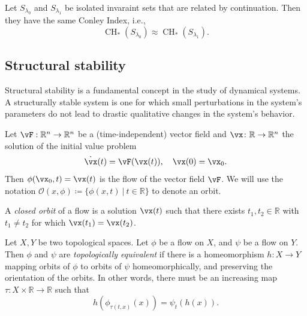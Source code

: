 \documentclass{article}
\newcommand{\reals}{\mathbb{R}}
\newcounter{ct}
\begin{document}
\begin{theorem}
Let $S_{\lambda_0}$ and $S_{\lambda_1}$ be isolated invaraint sets that are related by continuation. 
Then they have the same Conley Index, i.e.,
\[
\operatorname{CH}_*(S_{\lambda_0})\approx \operatorname{CH}_*(S_{\lambda_1}).
\]
\end{theorem}


\subsection{Structural stability}\label{sec:ss}
 \citep{peixoto1959ss, mane1987ss, hu1994ss, hayashi1997invariant, robbin1971ss, robinson1974ss, palis1970ss}

Structural stability is a fundamental concept in the study of dynamical systems. A structurally stable system is one for which small perturbations in the system's parameters do not lead to drastic qualitative changes in the system's behavior.

\begin{definition}
Let $\vF: \reals^n\rightarrow \reals^n$ be a (time-independent) vector field and $\vx\colon\reals\rightarrow\reals^n$  the solution of the initial value problem
\[
\dot\vx(t) =  \vF(\vx(t)), \ \ \ \vx(0) = \vx_0.
\]
Then $ \phi (\vx_{0},t)=\vx(t)$ is the flow of the vector field $\vF$.
We will use the notation $\mathcal {O}(x,\phi)\coloneqq \{\phi(x,t)\ |\ t\in\reals\}$ to denote an orbit.
\end{definition}


\begin{definition}
A \emph{closed orbit} of a flow is a solution $\vx(t)$ such that there exists $t_1, t_2\in\reals$ with  $t_1\neq t_2$ for which $\vx(t_1) = \vx(t_2)$.
\end{definition}

\begin{definition}
Let $X,Y$ be two topological spaces. Let $\phi$ be a flow on $X$, and $\psi$ be a flow on $Y$.
Then $\phi$ and $\psi$ are \emph{topologically equivalent} if there is a homeomorphism $h\colon X\to Y$ mapping orbits of  $\phi$  to orbits of $\psi$  homeomorphically, and preserving the orientation of the orbits. In other words, there must be  an increasing map $\tau\colon X\times\reals\rightarrow\reals$ such that 
\begin{equation}\label{eq:topeq}
h(\phi_{\tau(t,x)}(x)) = \psi_t(h(x)).
\end{equation}
\end{definition}
\end{document}
